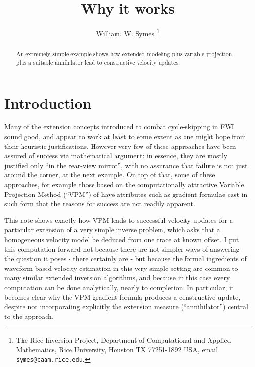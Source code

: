 \title{Why it works}
\author{William. W. Symes \thanks{The Rice Inversion Project,
Department of Computational and Applied Mathematics, Rice University,
Houston TX 77251-1892 USA, email {\tt symes@caam.rice.edu}.}}



\maketitle
\begin{abstract}
An extremely simple example shows how extended modeling plus variable projection plus a suitable annihilator lead to constructive velocity updates.
\end{abstract}

\section{Introduction}
Many of the extension concepts introduced to combat cycle-skipping in FWI sound good, and appear to work at least to some extent as one might hope from their heuristic justifications. However very few of these approaches have been assured of success via mathematical argument: in essence, they are mostly justified only ``in the rear-view mirror'', with no assurance that failure is not just around the corner, at the next example. On top of that, some of these approaches, for example those based on the computationally attractive Variable Projection Method (``VPM'') of \cite{GolubPereyra:03} have attributes such as gradient formulae cast in such form that the reasons for success are not readily apparent.

This note shows exactly how VPM leads to successful velocity updates for a particular extension of a very simple inverse problem, which asks that a homogeneous velocity model be deduced from one trace at known offset. I put this computation forward not because there are not simpler ways of answering the question it poses - there certainly are - but because the formal ingredients of waveform-based velocity estimation in this very simple setting are common to many similar extended inversion algorithms, and because in this case every computation can be done analytically, nearly to completion. In particular, it becomes clear why the VPM gradient formula produces a constructive update, despite not incorporating explicitly the extension measure (``annihilator'') central to the approach.

